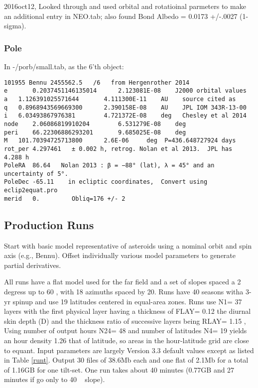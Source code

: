 \documentclass{article}
\begin{document}
2016oct12, Looked through \qcite{} and used orbital and rotatioinal parmeters to
make an additional entry in NEO.tab; also found Bond Albedo = 0.0173 +/-.0027
(1-sigma).

\subsubsection{Pole}

In -/porb/small.tab, as the 6'th object: 
\vspace{-3.mm} 
\begin{verbatim}
101955 Bennu 2455562.5   /6   from Hergenrother 2014
e       0.2037451146135014      2.123081E-08    J2000 orbital values 
a 	1.126391025571644       4.111300E-11	AU    source cited as 
q 	0.8968943569669300      2.390158E-08 	AU    JPL IOM 343R-13-00
i 	6.03493867976381        4.721372E-08	deg   Chesley et al 2014
node 	2.06086819910204        6.531279E-08	deg    
peri    66.22306886293201       9.685025E-08	deg
M 	101.70394725713800      2.6E-06 	deg  P=436.648727924 days
rot_per 4.297461   ± 0.002 h, retrog. Nolan et al 2013.  JPL has  4.288 h 
PoleRA  86.64   Nolan 2013 : β = −88° (lat), λ = 45° and an uncertainty of 5°.  
PoleDec -65.11    in ecliptic coordinates,  Convert using eclip2equat.pro 
merid   0.         Obliq=176 +/- 2
\end{verbatim}


\subsection{Production Runs}  %
 Start with basic model representative of asteroids using a nominal orbit and
 spin axis (e.g., Bennu). Offset individually various model parameters to
 generate partial derivatives.

 All runs have a flat model used for the far field and a set of slopes spaced a
 2 degress up to 60 \qd, with 18 azimuths spaced by 20\qd. Runs have 40 seasons
 witha 3-yr spinup and use 19 latitudes centered in equal-area zones. Runs use
 N1= 37 layers with the first physical layer having a thickness of FLAY= 0.12
 the diurnal skin depth (D) and the thickness ratio of successive layers being
 RLAY= 1.15 , Using number of output hours N24= 48 and number of latitudes N4=
 19 yields an hour density 1.26 that of latitude, so areas in the hour-latitude
 grid are close to equant.  Input parameters are largely Version 3.3 default
 values except as listed in Table \ref{runt}. Output 30 files of 38.6Mb each and
 one flat of 2.1Mb for a total of 1.16GB for one tilt-set. One run takes about
 40 minutes (0.77GB and 27 minutes if go only to 40 \qd~ slope).
\end{document}
